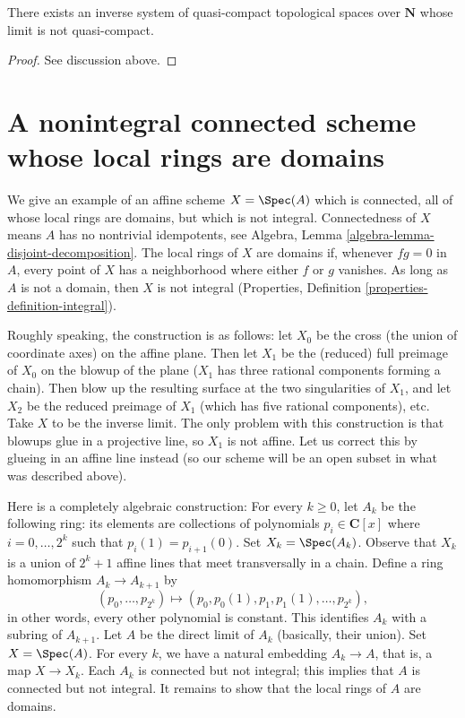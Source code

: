 \begin{lemma}
\label{lemma-lim-not-quasi-compact}
There exists an inverse system of quasi-compact topological spaces
over $\mathbf{N}$ whose limit is not quasi-compact.
\end{lemma}

\begin{proof}
See discussion above.
\end{proof}






\section{A nonintegral connected scheme whose local rings are domains}
\label{section-connected-locally-integral-not-integral}

\noindent
We give an example of an affine scheme $X = \Spec(A)$ which is
connected, all of whose local rings are domains, but which is not integral.
Connectedness of $X$ means $A$ has no nontrivial idempotents, see
Algebra, Lemma \ref{algebra-lemma-disjoint-decomposition}.
The local rings of $X$ are domains if, whenever $fg = 0$ in $A$, every
point of $X$ has a neighborhood where either $f$ or $g$ vanishes.
As long as $A$ is not a domain, then $X$ is not integral
(Properties, Definition \ref{properties-definition-integral}).

\medskip\noindent
Roughly speaking, the construction is as follows: let $X_0$ be the cross
(the union of coordinate axes) on the affine plane. Then let $X_1$ be
the (reduced) full preimage of $X_0$ on the blowup of the plane ($X_1$
has three rational components forming a chain).  Then blow up the
resulting surface at the two singularities of $X_1$, and let $X_2$ be
the reduced preimage of $X_1$ (which has five rational components), etc.
Take $X$ to be the inverse limit. The only problem with this construction
is that blowups glue in a projective line, so $X_1$ is not affine. Let us
correct this by glueing in an affine line instead (so our scheme will be an
open subset in what was described above).

\medskip\noindent
Here is a completely algebraic construction: For every $k \ge 0$, let $A_k$
be the following ring: its elements are collections of
polynomials $p_i \in \mathbf{C}[x]$ where $i = 0, \ldots, 2^k$ such that
$p_i(1) = p_{i + 1}(0)$. Set $X_k = \Spec(A_k)$. Observe that $X_k$ is
a union of $2^k + 1$ affine lines that meet transversally in a chain.
Define a ring homomorphism $A_k \to A_{k + 1}$ by
$$
(p_0, \ldots, p_{2^k})
\longmapsto
(p_0, p_0(1), p_1, p_1(1), \ldots, p_{2^k}),
$$
in other words, every other polynomial is constant. This identifies
$A_k$ with a subring of $A_{k + 1}$. Let $A$ be the direct limit of $A_k$
(basically, their union). Set $X = \Spec(A)$. For every $k$, we have
a natural embedding $A_k \to A$, that is, a map $X\to X_k$.
Each $A_k$ is connected but not integral; this implies that $A$ is
connected but not integral. It remains to show that the local rings of
$A$ are domains.

